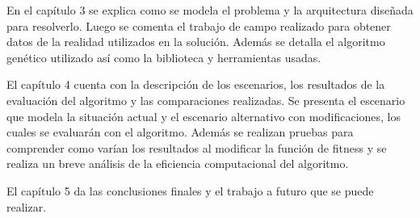 En el capítulo 3 se explica como se modela el problema y la arquitectura diseñada  para resolverlo. Luego se comenta el trabajo de campo realizado para obtener datos de la realidad utilizados en la solución. Además se detalla el algoritmo genético utilizado así como la biblioteca y herramientas usadas.

El capítulo 4 cuenta con la descripción de los escenarios, los resultados de la evaluación del algoritmo y las comparaciones realizadas. Se presenta el escenario que modela la situación actual y el escenario alternativo con modificaciones, los cuales se evaluarán con el algoritmo. Además se realizan pruebas para comprender como varían los resultados al modificar la función de fitness y se realiza un breve análisis de la eficiencia computacional del algoritmo.

El capítulo 5 da las conclusiones finales y el trabajo a futuro que se puede realizar.






